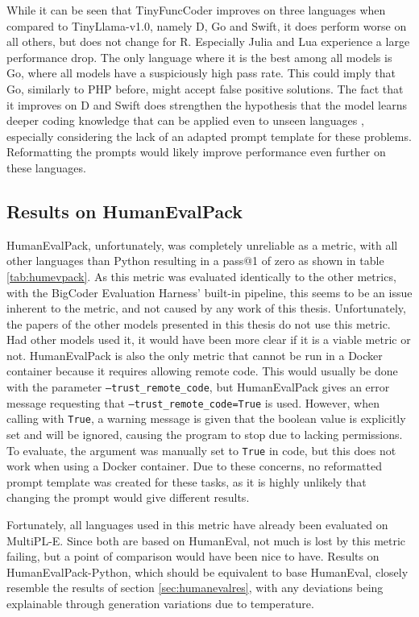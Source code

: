 While it can be seen that TinyFuncCoder improves on three languages when compared to TinyLlama-v1.0, namely D, Go and Swift, it does perform worse on all others, but does not change for R.
Especially Julia and Lua experience a large performance drop.
The only language where it is the best among all models is Go, where all models have a suspiciously high pass rate.
This could imply that Go, similarly to PHP before, might accept false positive solutions.
The fact that it improves on D and Swift does strengthen the hypothesis that the model learns deeper coding knowledge that can be applied even to unseen languages \cite{Wei.2024}, especially considering the lack of an adapted prompt template for these problems.
Reformatting the prompts would likely improve performance even further on these languages.


\subsection{Results on HumanEvalPack}
\label{sec:humanevalpackres}

HumanEvalPack, unfortunately, was completely unreliable as a metric, with all other languages than Python resulting in a pass@1 of zero as shown in table \ref{tab:humevpack}.
As this metric was evaluated identically to the other metrics, with the BigCoder Evaluation Harness' built-in pipeline, this seems to be an issue inherent to the metric, and not caused by any work of this thesis.
Unfortunately, the papers of the other models presented in this thesis do not use this metric.
Had other models used it, it would have been more clear if it is a viable metric or not.
HumanEvalPack is also the only metric that cannot be run in a Docker container because it requires allowing remote code.
This would usually be done with the parameter \texttt{--trust\_remote\_code}, but HumanEvalPack gives an error message requesting that \texttt{--trust\_remote\_code=True} is used.
However, when calling with \texttt{True}, a warning message is given that the boolean value is explicitly set and will be ignored, causing the program to stop due to lacking permissions.
To evaluate, the argument was manually set to \texttt{True} in code, but this does not work when using a Docker container.
Due to these concerns, no reformatted prompt template was created for these tasks, as it is highly unlikely that changing the prompt would give different results.

Fortunately, all languages used in this metric have already been evaluated on MultiPL-E.
Since both are based on HumanEval, not much is lost by this metric failing, but a point of comparison would have been nice to have.
Results on HumanEvalPack-Python, which should be equivalent to base HumanEval, closely resemble the results of section \ref{sec:humanevalres}, with any deviations being explainable through generation variations due to temperature.

